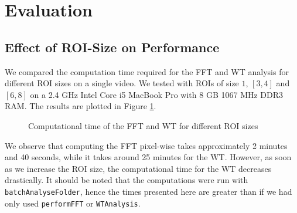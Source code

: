 \documentclass[11pt]{scrartcl}
\begin{document}
\section{Evaluation}

\subsection{Effect of ROI-Size on Performance}
\label{sec:effect-roi-size}

We compared the computation time required for the FFT and WT analysis for different ROI sizes on a single video. We tested with ROIs of size $1$, $[3, 4]$ and $[6, 8]$ on a 2.4 GHz Intel Core i5 MacBook Pro with 8 GB 1067 MHz DDR3 RAM. The results are plotted in Figure \ref{fig:computational-time}.

\speed
\begin{figure}[ht]
  \begin{minipage}{0.4\linewidth}
    \centering
    \pgfplotstabletypeset[columns={FFT,WT}]\speed
    
  \end{minipage}
  \begin{minipage}{0.6\linewidth}
    \centering
  \end{minipage}
  \caption{Computational time of the FFT and WT for different ROI sizes}
  \label{fig:computational-time}
\end{figure}

We observe that computing the FFT pixel-wise takes approximately 2 minutes and 40 seconds, while it takes around 25 
minutes for the WT. However, as soon as we increase the ROI size, the computational time for the WT decreases
drastically. It should be noted that the computations were run with \texttt{batchAnalyseFolder}, hence the
times presented here are greater than if we had only used \texttt{performFFT} or \texttt{WTAnalysis}.
\end{document}
